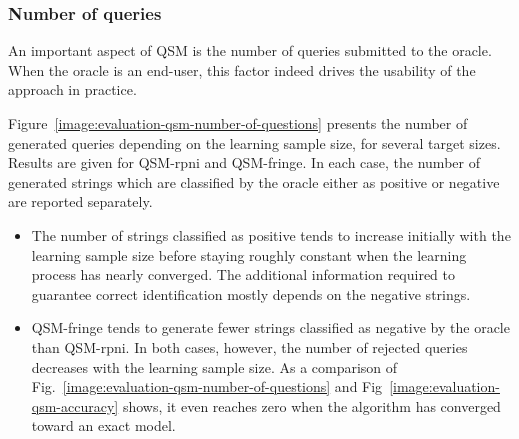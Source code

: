 \subsubsection*{Number of queries\label{subsection:evaluation-synthetic-queries-on-qsm}}

An important aspect of QSM is the number of queries submitted to the oracle. When the oracle is an end-user, this factor indeed drives the usability of the approach in practice. 

Figure~\ref{image:evaluation-qsm-number-of-questions} presents the number of generated queries depending on the learning sample size, for several target sizes. Results are given for QSM-rpni and QSM-fringe. In each case, the number of generated strings which are classified by the oracle either as positive or negative are reported separately.

\begin{itemize}
\item The number of strings classified as positive tends to increase initially with the learning sample size before staying roughly constant when the learning process has nearly converged. The additional information required to guarantee correct identification mostly depends on the negative strings.
\item QSM-fringe tends to generate fewer strings classified as negative by the oracle than QSM-rpni. In both cases, however, the number of rejected queries decreases with the learning sample size. As a comparison of Fig.~\ref{image:evaluation-qsm-number-of-questions} and Fig~\ref{image:evaluation-qsm-accuracy} shows, it even reaches zero when the algorithm has converged toward an exact model.
\end{itemize}

